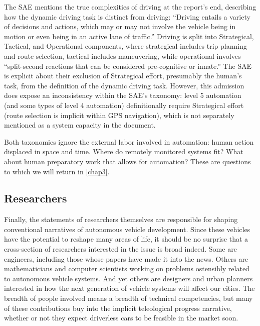 The SAE mentions the true complexities of driving at the report's end,
describing how the dynamic driving task is distinct from driving:
``Driving entails a variety of decisions and actions, which may or may
not involve the vehicle being in motion or even being in an active
lane of traffic.''\cite{???} Driving is split into Strategical, Tactical, and
Operational components, where strategical includes trip planning and
route selection, tactical includes maneuvering, while operational
involves ``split-second reactions that can be considered pre-cognitive
or innate.''\cite{???} The SAE is explicit about their exclusion of Strategical
effort, presumably the human's task, from the definition of the
dynamic driving task. However, this admission does expose an
inconsistency within the SAE's taxonomy: level 5 automation (and some
types of level 4 automation) definitionally require Strategical effort
(route selection is implicit within GPS navigation), which is not
separately mentioned as a system capacity in the document.

Both taxonomies ignore the external labor involved in automation:
human action displaced in space and time. Where do remotely monitored
systems fit? What about human preparatory work that allows for
automation? These are questions to which we will return in \ref{chap3}.

\subsection{Researchers}

Finally, the statements of researchers themselves are responsible for
shaping conventional narratives of autonomous vehicle development.
Since these vehicles have the potential to reshape many areas of life, it should
be no surprise that a cross-section of researchers interested in the
issue is broad indeed. Some are engineers, including those whose
papers have made it into the news. Others are mathematicians and
computer scientists working on problems ostensibly related to
autonomous vehicle systems. And yet others are designers and urban
planners interested in how the next generation of vehicle systems will
affect our cities. The breadth of people involved means a breadth of
technical competencies, but many of these contributions buy into the
implicit teleological progress narrative, whether or not they expect
driverless cars to be feasible in the market soon.


